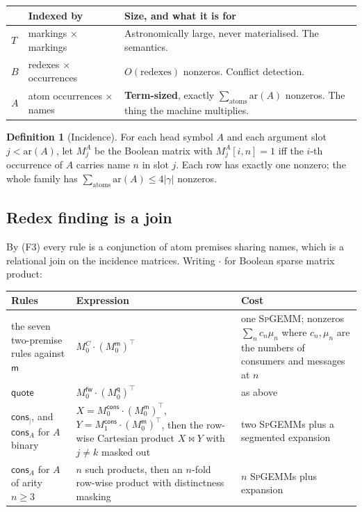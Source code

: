 \documentclass[11pt,a4paper]{article}
\theoremstyle{plain}
\theoremstyle{definition}
\newtheorem{definition}[theorem]{Definition}
\theoremstyle{remark}
\newcommand{\mm}{\mathsf{m}}
\newcommand{\fw}{\mathsf{fw}}
\newcommand{\qq}{\mathsf{q}}
\newcommand{\cons}{\mathsf{cons}}
\newcommand{\consp}{\mathsf{cons}_{\mid}}
\begin{document}
\begin{center}
\begin{tabular}{@{}llL{0.42\textwidth}@{}}
\toprule
& \textbf{Indexed by} & \textbf{Size, and what it is for} \\
\midrule
$T$ & markings $\times$ markings &
  Astronomically large, never materialised. The semantics. \\
$B$ & redexes $\times$ occurrences &
  $O(\text{redexes})$ nonzeros. Conflict detection. \\
$A$ & atom occurrences $\times$ names &
  \textbf{Term-sized}, exactly $\sum_{\text{atoms}} \mathrm{ar}(A)$ nonzeros.
  The thing the machine multiplies. \\
\bottomrule
\end{tabular}
\end{center}

\begin{definition}[Incidence]
\label{def:inc}
For each head symbol $A$ and each argument slot $j < \mathrm{ar}(A)$, let
$M^{A}_{j}$ be the Boolean matrix with $M^{A}_{j}[i,n] = 1$ iff the $i$-th
occurrence of $A$ carries name $n$ in slot $j$. Each row has exactly one
nonzero; the whole family has $\sum_{\text{atoms}} \mathrm{ar}(A) \le 4|\gamma|$
nonzeros.
\end{definition}

\subsection{Redex finding is a join}

By (F3) every rule is a conjunction of atom premises sharing names, which is a
relational join on the incidence matrices. Writing $\cdot$ for Boolean sparse
matrix product:

\begin{center}\small
\begin{tabular}{@{}L{0.19\textwidth}L{0.33\textwidth}L{0.38\textwidth}@{}}
\toprule
\textbf{Rules} & \textbf{Expression} & \textbf{Cost} \\
\midrule
the seven two-premise rules against $\mm$
  & $M^{C}_{0} \cdot (M^{\mm}_{0})^{\!\top}$
  & one \textsc{SpGEMM}; nonzeros
    $\sum_{n} c_{n}\mu_{n}$ where $c_n,\mu_n$ are the numbers of consumers and
    messages at $n$ \\
$\mathsf{quote}$
  & $M^{\fw}_{0} \cdot (M^{\qq}_{0})^{\!\top}$ & as above \\
$\consp$, and $\cons_{A}$ for $A$ binary
  & $X = M^{\cons}_{0}\cdot(M^{\mm}_{0})^{\!\top}$,
    $Y = M^{\cons}_{1}\cdot(M^{\mm}_{0})^{\!\top}$, then the row-wise
    Cartesian product $X \bowtie Y$ with $j \neq k$ masked out
  & two \textsc{SpGEMM}s plus a segmented expansion \\
$\cons_{A}$ for $A$ of arity $n \geq 3$
  & $n$ such products, then an $n$-fold row-wise product with
    distinctness masking
  & $n$ \textsc{SpGEMM}s plus expansion \\
\bottomrule
\end{tabular}
\end{center}
\end{document}
